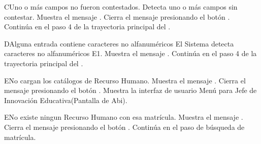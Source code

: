 
\begin{UCtrayectoriaA}{C}{Uno o más campos no fueron contestados.}
	\UCpaso Detecta uno o más campos sin contestar.
    \UCpaso Muestra el mensaje .
    \UCpaso[\UCactor] Cierra el mensaje presionando el botón .
    \UCpaso Continúa en el paso 4 de la trayectoria principal del .
\end{UCtrayectoriaA}

\begin{UCtrayectoriaA}{D}{Alguna entrada  contiene caracteres no alfanuméricos}
	\UCpaso El Sistema detecta caracteres no alfanuméricos E1.
    \UCpaso Muestra el mensaje .
    \UCpaso Continúa en el paso 4 de la trayectoria principal del .
\end{UCtrayectoriaA}

\begin{UCtrayectoriaA}{E}{No cargan los catálogos de Recurso Humano.}
    \UCpaso Muestra el mensaje .
    \UCpaso[\UCactor] Cierra el mensaje presionando el botón .
\UCpaso Muestra la interfaz de usuario Menú para Jefe de Innovación Educativa(Pantalla de Abi).
\end{UCtrayectoriaA}

\begin{UCtrayectoriaA}{E}{No existe ningun Recurso Humano con esa matrícula.}
    \UCpaso Muestra el mensaje .
    \UCpaso[\UCactor] Cierra el mensaje presionando el botón .
\UCpaso Continúa en el paso  de búsqueda de matrícula.
\end{UCtrayectoriaA}